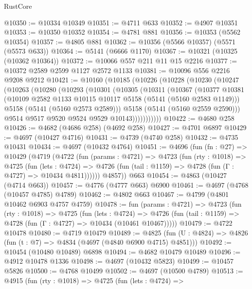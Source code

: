 \begin{lexlean}{RustCore}
\begin{coremodule}
@10350 := @10334 @10349
@10351 := @4711 @633
@10352 := @4907 @10351
@10353 := @10350 @10352
@10354 := @4781 @881
@10356 := @10353 (@5562 @10354)
@10357 := @4805 @881
@10362 := @10356 (@5566 @10357) (@5571 (@5573 @633))
@10364 := @5141 (@6666 @1170)
@10367 := @10321 (@10325 (@10362 @10364))
@10372 := @10066 @557 @211 @11 @15 @2216
@10377 := @10372 @2589 @2599 @1127 @2572 @1133
@10381 := @10096 @556 @2216 @9208 @9212
@10421 := @10160
    (@10185
      (@10226
        (@10228
          (@10230
            (@10247
              (@10263
                (@10280
                  (@10293
                    (@10301
                      (@10305
                        (@10311
                          (@10367
                            (@10377
                              @10381
                              (@10109 @2582 @1133 @10115 @10117 @5158 (@5141 (@5160 @2583 @1149)))
                              @5158
                              (@5141 (@5160 @2573 @2589)))
                            @5158
                            (@5141 (@5160 @2559 @2590)))
                          @9514
                          @9517
                          @9520
                          @9524
                          @9529
                          @10143)))))))))))
@10422 := @4680 @258
@10426 := @4682 (@4686 @258) (@4692 @258)
@10427 := @4701 @6897
@10429 := @4697 (@10427 @4716)
@10431 := @4739 (@4740 @258)
@10432 := @4735 @10431
@10434 := @4697 (@10432 @4764)
@10451 := @4696
    (fun (fn : @27) =>
    @10429
      (@4719
        (@4722
          (fun (params : @4721) =>
          @4723
            (fun (rty : @1018) =>
            @4725
              (fun (lets : @4724) =>
              @4726 (fun (tail : @1159) => @4728 (fun (Γ : @4727) => @10434 @4811))))))
        @4857))
    @663
@10454 := @4863 (@10427 (@4714 @663))
@10457 := @4776 (@4777 @663) @6900
@10461 := @4697 (@4768 (@10457 @4785) @4789)
@10462 := @4802 @663
@10467 := @4799 (@4801 @10462 @6903 @4757 @4759)
@10478 := fun (params : @4721) =>
  @4723
    (fun (rty : @1018) =>
    @4725
      (fun (lets : @4724) =>
      @4726 (fun (tail : @1159) => @4728 (fun (Γ : @4727) => @10434 (@10461 @10467)))))
@10479 := @4722 @10478
@10480 := @4719 @10479
@10489 := @4825 (fun (U : @4824) => @4826 (fun (t : @7) => @4834 (@4697 (@4840 @6900 @4715) @4851)))
@10492 := @10454 (@10480 @10489) @6898
@10494 := @4682 @10479 @10489
@10496 := @4912 @10478 @1336
@10498 := @4697 (@10432 @5823)
@10499 := @10457 @5826
@10500 := @4768 @10499
@10502 := @4697 (@10500 @4789)
@10513 := @4915
    (fun (rty : @1018) =>
    @4725
      (fun (lets : @4724) =>

\end{coremodule}
\end{lexlean}
